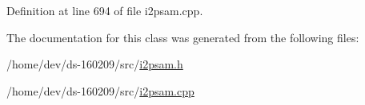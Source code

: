 Definition at line 694 of file i2psam.\+cpp.



The documentation for this class was generated from the following files\+:\begin{DoxyCompactItemize}
\item 
/home/dev/ds-\/160209/src/\hyperlink{i2psam_8h}{i2psam.\+h}\item 
/home/dev/ds-\/160209/src/\hyperlink{i2psam_8cpp}{i2psam.\+cpp}\end{DoxyCompactItemize}
